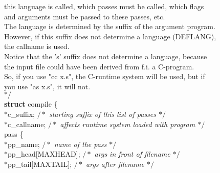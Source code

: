 \begin{flushleft}
{\hspace*{3\indentation}this language is called, which passes must be called, which flags\mbox{}\\
\hspace*{3\indentation}and arguments must be passed to these passes, etc.\mbox{}\\
\hspace*{3\indentation}The language is determined by the suffix of the argument program.\mbox{}\\
\hspace*{3\indentation}However, if this suffix does not determine a language (DEFLANG),\mbox{}\\
\hspace*{3\indentation}the callname is used.\mbox{}\\
\hspace*{3\indentation}Notice that the 's' suffix does not determine a language, because\mbox{}\\
\hspace*{3\indentation}the input file could have been derived from f.i. a C-program.\mbox{}\\
\hspace*{3\indentation}So, if you use "cc x.s", the C-runtime system will be used, but if\mbox{}\\
\hspace*{3\indentation}you use "as x.s", it will not.\mbox{}\\
$\ast/$}\mbox{}\\
{\bf struct} compile \{\mbox{}\\
\hspace*{3\indentation}{\bf char} $\ast$c\_suffix;      {$/\ast$\it{} starting suffix of this list of passes $\ast/$}\mbox{}\\
\hspace*{3\indentation}{\bf char} $\ast$c\_callname; {$/\ast$\it{} affects runtime system loaded with program $\ast/$}\mbox{}\\
\hspace*{3\indentation}{\bf struct} pass \{\mbox{}\\
\hspace*{6\indentation}{\bf char} $\ast$pp\_name;    {$/\ast$\it{} name of the pass $\ast/$}\mbox{}\\
\hspace*{6\indentation}{\bf char} $\ast$pp\_head[MAXHEAD]; {$/\ast$\it{} args in front of filename $\ast/$}\mbox{}\\
\hspace*{6\indentation}{\bf char} $\ast$pp\_tail[MAXTAIL]; {$/\ast$\it{} args after filename $\ast/$}\mbox{}\\

\end{flushleft}
